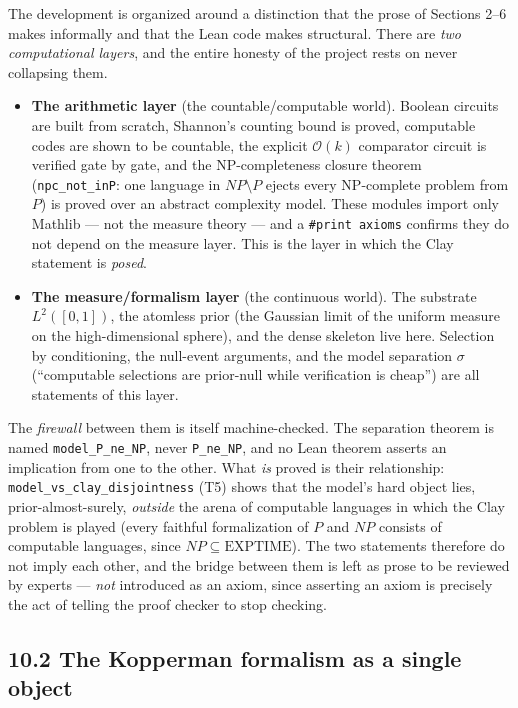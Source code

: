 \documentclass[11pt,a4paper]{report}
\begin{document}
The development is organized around a distinction that the prose of Sections 2--6
makes informally and that the Lean code makes structural. There are \emph{two
computational layers}, and the entire honesty of the project rests on never
collapsing them.

\begin{itemize}
\item
  \textbf{The arithmetic layer} (the countable/computable world). Boolean
  circuits are built from scratch, Shannon's counting bound is proved, computable
  codes are shown to be countable, the explicit \(\mathcal{O}(k)\) comparator
  circuit is verified gate by gate, and the NP-completeness closure theorem
  (\texttt{npc\_not\_inP}: one language in \(NP \setminus P\) ejects every
  NP-complete problem from \(P\)) is proved over an abstract complexity model.
  These modules import only Mathlib --- not the measure theory --- and a
  \texttt{\#print axioms} confirms they do not depend on the measure layer. This
  is the layer in which the Clay statement is \emph{posed}.
\item
  \textbf{The measure/formalism layer} (the continuous world). The substrate
  \(L^{2}([0,1])\), the atomless prior (the Gaussian limit of the uniform measure
  on the high-dimensional sphere), and the dense skeleton live here. Selection by
  conditioning, the null-event arguments, and the model separation
  \(\sigma\) (``computable selections are prior-null while verification is
  cheap'') are all statements of this layer.
\end{itemize}

The \emph{firewall} between them is itself machine-checked. The separation
theorem is named \texttt{model\_P\_ne\_NP}, never \texttt{P\_ne\_NP}, and no Lean
theorem asserts an implication from one to the other. What \emph{is} proved is
their relationship: \texttt{model\_vs\_clay\_disjointness} (T5) shows that the
model's hard object lies, prior-almost-surely, \emph{outside} the arena of
computable languages in which the Clay problem is played (every faithful
formalization of \(P\) and \(NP\) consists of computable languages, since
\(NP \subseteq \mathrm{EXPTIME}\)). The two statements therefore do not imply each
other, and the bridge between them is left as prose to be reviewed by experts ---
\emph{not} introduced as an axiom, since asserting an axiom is precisely the act
of telling the proof checker to stop checking.

\subsection*{10.2 The Kopperman formalism as a single object}
\end{document}
